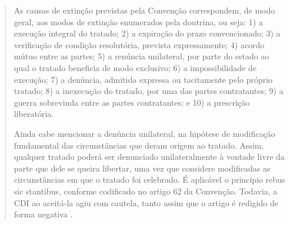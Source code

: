 \documentclass{article}
\begin{document}
\begin{quote}
    As causas de extinção previstas pela Convenção correspondem, de modo geral, aos modos de extinção enumerados pela doutrina, ou seja: 1) a execução integral do tratado; 2) a expiração do prazo convencionado; 3) a verificação de condição resolutória, prevista expressamente; 4) acordo mútuo entre as partes; 5) a renúncia unilateral, por parte do estado ao qual o tratado beneficia de modo exclusivo; 6) a impossibilidade de execução; 7) a denúncia, admitida expressa ou tacitamente pelo próprio tratado; 8) a inexecução do tratado, por uma das partes contratantes; 9) a guerra sobrevinda entre as partes contratantes; e 10) a prescrição liberatória.

    Ainda cabe mencionar a denúncia unilateral, na hipótese de modificação fundamental das circunstâncias que deram origem ao tratado. Assim, qualquer tratado poderá ser denunciado unilateralmente à vontade livre da parte que dele se queira libertar, uma vez que considere modificadas as circunstâncias em que o tratado foi celebrado. É aplicável o princípio rebus sic stantibus, conforme codificado no artigo 62 da Convenção. Todavia, a CDI ao aceitá-la agiu com cautela, tanto assim que o artigo é redigido de forma negativa \cite[p.~167-168]{accioly_manual_2023}.
\end{quote}

\printbibliography
\end{document}

